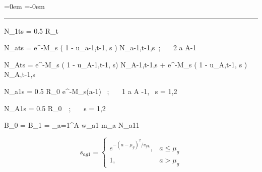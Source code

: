 \leftskip=0em
\parindent=-0em


\vspace{1ex} \hrule


\vspace{-1ex}

 \eec

\vsd

\beq N_{1ts} = 0.5 R_t  \label{df1} \eeq \vsd \vsd \vsd    %

\beq N_{ats} = e^{-M_s} ( 1 - u_{a-1,t-1, s} ) N_{a-1,t-1,s}
  \,; \ \ \ 2 \leq a \leq A-1
  \label{df2} \eeq \vsd \vsd \vsd

\beq  N_{Ats} = e^{-M_s} ( 1 - u_{A-1,t-1, s}) N_{A-1,t-1,s}
  + e^{-M_s} ( 1 - u_{A,t-1, s} ) N_{A,t-1,s} 
\label{df3}
  \eeq \vsd

 \eec  %

\vsd

\beq N_{a1s} = 0.5 R_0 e^{-M_{s}(a-1)} \, ; \ \ \
  1 \leq a \leq A -1, \,  s = 1,2  \label{de1} \eeq \vsd \vsd \vsd \vsd

\beq N_{A1s} = 0.5 R_0\,  \, ; \ \ \  s = 1,2
  \label{de2} \eeq \vsd \vsd \vsd \vsd

\beq B_0 = B_1 = \sum_{a=1}^A w_{a1} m_a N_{a11} 
  \label{dS0} \eeq \vsd


{} \eec 

\vspace{-2ex}

\begin{fleqn}     %
\begin{equation}
s_{ag1} = \left\{
 \begin{array}{ll}
 e^{-(a - \mu_g)^2 / v_{gL}}, & a \leq \mu_g\\
 1, & a > \mu_g
\label{self}
 \end{array}
\right.
\end{equation}
\end{fleqn}
\vspace{-5ex}


